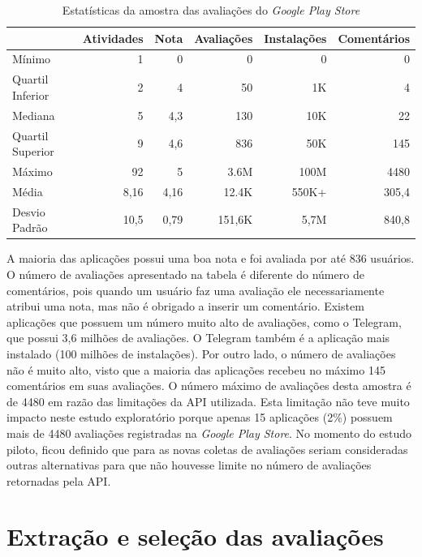 \begin{table}[htb]

\centering
\caption{Estatísticas da amostra das avaliações do \textit{Google Play Store}}
\small
\label{tab:summarygps}
\begin{tabular}{lrrrrr}
\hline
             & Atividades & Nota & Avaliações     & Instalações  & Comentários \\
\hline
Mínimo          & 1          & 0     & 0            & 0         & 0       \\
Quartil Inferior           & 2          & 4           & 50    & 1K      & 4       \\
Mediana       & 5          & 4,3   & 130         & 10K     & 22      \\
Quartil Superior          & 9          & 4,6   & 836        & 50K     & 145     \\
Máximo          & 92         & 5     & 3.6M    & 100M & 4480    \\
Média         & 8,16       & 4,16  & 12.4K     & 550K+    & 305,4   \\
Desvio Padrão        & 10,5       & 0,79  & 151,6K  & 5,7M   & 840,8  \\
\hline
\end{tabular}
\end{table}

A maioria das aplicações possui uma boa nota e foi avaliada por até 836 usuários. O número de avaliações apresentado na tabela é diferente do número de comentários, pois quando um usuário faz uma avaliação ele necessariamente atribui uma nota, mas não é obrigado a inserir um comentário. Existem aplicações que possuem um número muito alto de avaliações, como o Telegram, que possui 3,6 milhões de avaliações. O Telegram também é a aplicação mais instalado (100 milhões de instalações).
Por outro lado, o número de avaliações não é muito alto, visto que a maioria das aplicações recebeu no máximo 145 comentários em suas avaliações. O número máximo de avaliações desta amostra é de 4480 em razão das limitações da API utilizada. Esta limitação não teve muito impacto neste estudo exploratório porque apenas 15 aplicações (2\%) possuem mais de 4480 avaliações registradas na \textit{Google Play Store}. 
No momento do estudo piloto, ficou definido que para as novas coletas de avaliações seriam consideradas outras alternativas para que não houvesse limite no número de avaliações retornadas pela API. 


\section{Extração e seleção das avaliações}
\label{sec:extracaoselecao}

